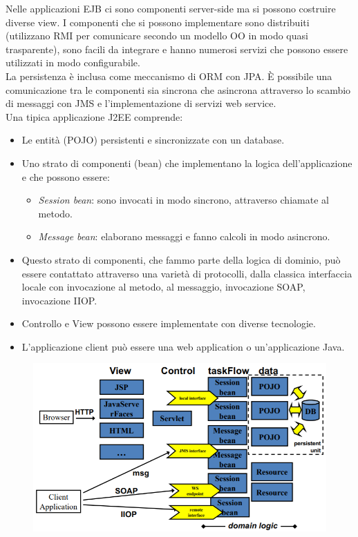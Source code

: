Nelle applicazioni EJB ci sono componenti server-side ma si possono costruire diverse view. I componenti che si possono implementare sono distribuiti (utilizzano RMI per comunicare secondo un modello OO in modo quasi trasparente), sono facili da integrare e hanno numerosi servizi che possono essere utilizzati in modo configurabile.\\

La persistenza è inclusa come meccanismo di ORM con JPA. È possibile una comunicazione tra le componenti sia sincrona che asincrona attraverso lo scambio di messaggi con JMS e l’implementazione di servizi web service. \\

Una tipica applicazione J2EE comprende:
\begin{itemize}
    \item Le entità (POJO) persistenti e sincronizzate con un database.
    \item Uno strato di componenti (bean) che implementano la logica dell’applicazione e che possono essere: 
        \begin{itemize}
            \item \textit{Session bean}: sono invocati in modo sincrono, attraverso chiamate al metodo.
            \item \textit{Message bean}: elaborano messaggi e fanno calcoli in modo asincrono.
        \end{itemize}
    \item Questo strato di componenti, che fammo parte della logica di dominio, può essere contattato attraverso una varietà di protocolli, dalla classica interfaccia locale con invocazione al metodo, al messaggio, invocazione SOAP, invocazione IIOP.
    \item Controllo e View possono essere implementate con diverse tecnologie.
    \item L’applicazione client può essere una web application o un’applicazione Java. 
\end{itemize}
\begin{figure}[H]
    \centering
    \includegraphics[scale=0.5]{Imm/j2ee-scheme.png}
\end{figure}
    
